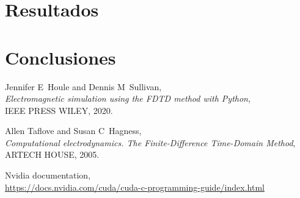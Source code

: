 \documentclass[11pt,a4paper,twoside,pdf]{article}
\numberwithin{equation}{section}
\begin{document}
\newpage



\section{Resultados}

\newpage




\section{Conclusiones}



\newpage


\begin{thebibliography}{100}

  Jennifer E~Houle and Dennis M~Sullivan, \\
  {\em Electromagnetic simulation using the FDTD method with Python}, \\
  IEEE PRESS WILEY, 2020.
  
  Allen Taflove and Susan C~Hagness, \\
  {\em Computational electrodynamics. The Finite-Difference Time-Domain Method}, \\
  ARTECH HOUSE, 2005.

 Nvidia documentation, \\
 \href{https://docs.nvidia.com/cuda/cuda-c-programming-guide/index.html}{https://docs.nvidia.com/cuda/cuda-c-programming-guide/index.html}





 
\end{thebibliography}
\end{document}
